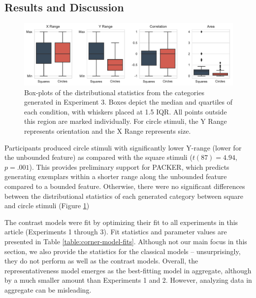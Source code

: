 \documentclass[12pt]{article}
\begin{document}
\begin{flushleft}
\subsection{Results and Discussion}



\begin{figure}
    \begin{center}
      \includegraphics[width=\textwidth]{figs/e3-statsboxes.pdf}
    \caption{Box-plots of the distributional statistics from the categories
generated in Experiment 3. Boxes depict the median and quartiles of each
condition, with whiskers placed at 1.5 IQR. All points outside this region are
marked individually. For circle stimuli, the Y Range represents orientation and
the X Range represents size.}
    \label{fig:e3-statsboxes}
    \end{center}
\end{figure}

Participants produced circle stimuli with significantly lower Y-range (lower for the unbounded feature) as compared with the square stimuli ($t(87) = 4.94$, $p = .001$).  This
provides preliminary support for PACKER, which predicts generating exemplars
within a shorter range along the unbounded feature compared to a bounded
feature. Otherwise, there were no significant differences between the distributional statistics of each
generated category between square and circle stimuli (Figure
\ref{fig:e3-statsboxes})

The contrast models were fit by optimizing their fit to all experiments in this
article (Experiments 1 through 3). Fit statistics and parameter values are
presented in Table \ref{table:corner-model-fits}. Although not our main focus in
this section, we also provide the statistics for the classical models --
unsurprisingly, they do not perform as well as the contrast models. Overall,
the representativeness model emerges as the best-fitting model in aggregate, although by a much smaller amount than Experiments 1 and 2. However, analyzing data in aggregate can be misleading.



\end{flushleft}
\end{document}
